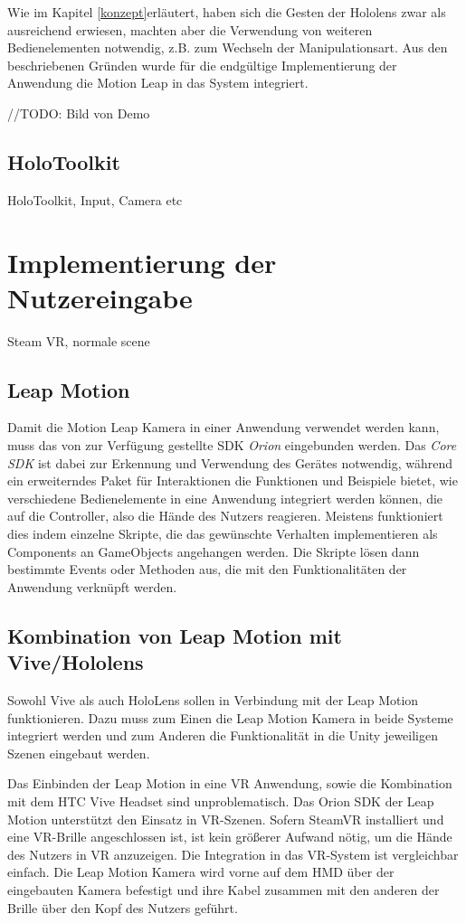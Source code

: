 Wie im Kapitel \ref{konzept}erläutert, haben sich die Gesten der Hololens zwar als ausreichend erwiesen, machten aber die Verwendung von weiteren Bedienelementen notwendig, z.B. zum Wechseln der Manipulationsart. Aus den beschriebenen Gründen wurde für die endgültige Implementierung der Anwendung die Motion Leap in das System integriert.

//TODO: Bild von Demo

\subsection{HoloToolkit}

HoloToolkit, Input, Camera etc
\section{Implementierung der Nutzereingabe}
Steam VR, normale scene

\subsection{Leap Motion}

Damit die Motion Leap Kamera in einer Anwendung verwendet werden kann, muss das von \citet{orion} zur Verfügung gestellte SDK \textit{Orion} eingebunden werden. Das \textit{Core SDK} ist dabei zur Erkennung und Verwendung des Gerätes notwendig, während ein erweiterndes Paket für Interaktionen die Funktionen und Beispiele bietet, wie verschiedene Bedienelemente in eine Anwendung integriert werden können, die auf die Controller, also die Hände des Nutzers reagieren.
Meistens funktioniert dies indem einzelne Skripte, die das gewünschte Verhalten implementieren als Components an GameObjects angehangen werden. Die Skripte lösen dann bestimmte Events oder Methoden aus, die mit den Funktionalitäten der Anwendung verknüpft werden. 

\subsection{Kombination von Leap Motion mit Vive/Hololens}
\label{kombination}

Sowohl Vive als auch HoloLens sollen in Verbindung mit der Leap Motion funktionieren. Dazu muss zum Einen die Leap Motion Kamera in beide Systeme integriert werden und zum Anderen die Funktionalität in die Unity jeweiligen Szenen eingebaut werden. 

Das Einbinden der Leap Motion in eine VR Anwendung, sowie die Kombination mit dem HTC Vive Headset sind unproblematisch. Das Orion SDK der Leap Motion unterstützt den Einsatz in VR-Szenen. Sofern SteamVR installiert und eine VR-Brille angeschlossen ist, ist kein größerer Aufwand nötig, um die Hände des Nutzers in VR anzuzeigen. 
Die Integration in das VR-System ist vergleichbar einfach. Die Leap Motion Kamera wird vorne auf dem HMD über der eingebauten Kamera befestigt und ihre Kabel zusammen mit den anderen der Brille über den Kopf des Nutzers geführt. 

